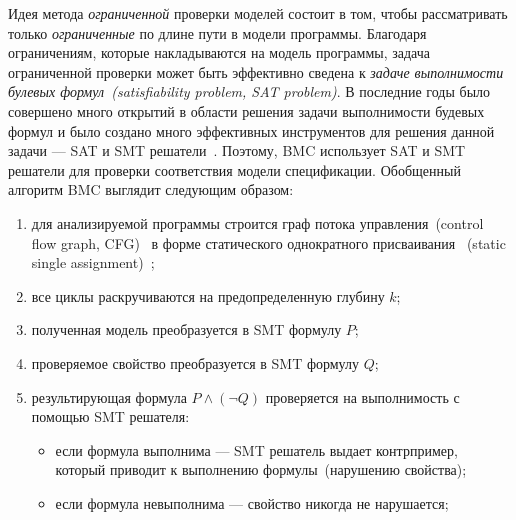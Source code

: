 Идея метода \emph{ограниченной} проверки моделей состоит в том, чтобы 
рассматривать только \emph{ограниченные} по длине пути в модели программы.
Благодаря ограничениям, которые накладываются на модель программы, задача
ограниченной проверки может быть эффективно сведена к \emph{задаче 
выполнимости булевых формул~(satisfiability problem, SAT problem)}. В 
последние годы было совершено много открытий в области решения задачи 
выполнимости будевых формул и было создано много эффективных инструментов для
решения данной задачи --- SAT и SMT решатели~\cite{sat, smt}. Поэтому, BMC 
использует SAT и SMT решатели для проверки соответствия модели спецификации.
Обобщенный алгоритм BMC выглядит следующим образом:
\begin{enumerate}
\item для анализируемой программы строится граф потока управления~(control
flow graph, CFG)~\cite{cfg} в форме статического однократного присваивания
~(static single assignment)~\cite{ssa};

\item все циклы раскручиваются на предопределенную глубину $k$;

\item полученная модель преобразуется в SMT формулу $P$;

\item проверяемое свойство преобразуется в SMT формулу $Q$;

\item результирующая формула $P \land (\neg Q)$ проверяется на выполнимость с
помощью SMT решателя:
	\begin{itemize}
	\item если формула выполнима --- SMT решатель выдает контрпример, который 
	приводит к выполнению формулы~(нарушению свойства);
	\item если формула невыполнима --- свойство никогда не нарушается;
	\end{itemize}
\end{enumerate}

